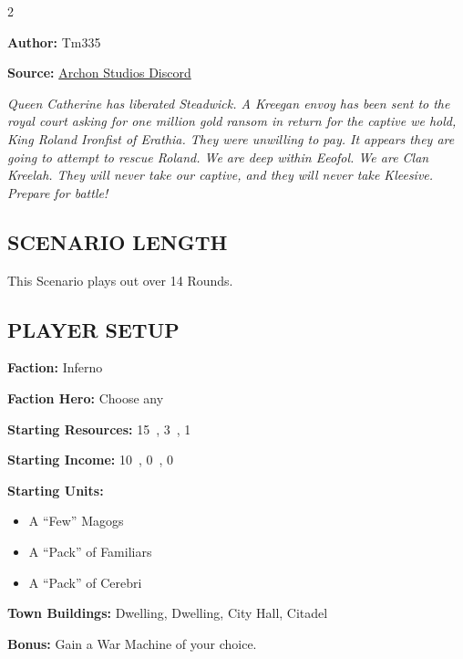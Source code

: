 
\begin{multicols}{2}

\textbf{Author:} Tm335

\textbf{Source:} \href{https://discord.com/channels/740870068178649108/1253923753981902939/1253923753981902939}{Archon Studios Discord}

\textit{Queen Catherine has liberated Steadwick.
A Kreegan envoy has been sent to the royal court asking for one million gold ransom in return for the captive we hold, King Roland Ironfist of Erathia.
They were unwilling to pay.
It appears they are going to attempt to rescue Roland.
We are deep within Eeofol.
We are Clan Kreelah.
They will never take our captive, and they will never take Kleesive.
Prepare for battle!}

\subsection*{\MakeUppercase{Scenario Length}}

This Scenario plays out over 14 Rounds.

\subsection*{\MakeUppercase{Player Setup}}

\textbf{Faction:} Inferno

\textbf{Faction Hero:} Choose any

\textbf{Starting Resources:} 15~, 3~, 1~

\textbf{Starting Income:} 10~, 0~, 0~

\textbf{Starting Units:}

\begin{itemize}
  \item A ``Few'' Magogs
  \item A ``Pack'' of Familiars
  \item A ``Pack'' of Cerebri
\end{itemize}

\textbf{Town Buildings:}  Dwelling,  Dwelling, City Hall, Citadel

\textbf{Bonus:} Gain a War Machine of your choice.


\end{multicols}
